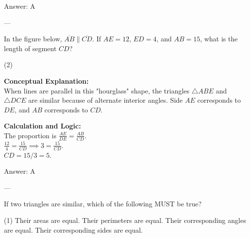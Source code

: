 \documentclass[11pt,paper=a4,answers]{exam}
\begin{document}
\begin{questions}
\begin{solution}
\vspace{15pt}
Answer: \colorbox{yellow!100}{A}
\end{solution}

---

\question
In the figure below, $\overline{AB} \parallel \overline{CD}$. If $AE = 12$, $ED = 4$, and $AB = 15$, what is the length of segment $CD$?
\begin{center}
\end{center}
\begin{tasks}(2)
\end{tasks}

\begin{solution}
\textbf{Conceptual Explanation:} \\
When lines are parallel in this "hourglass" shape, the triangles $\triangle ABE$ and $\triangle DCE$ are similar because of alternate interior angles. Side $AE$ corresponds to $DE$, and $AB$ corresponds to $CD$.

\vspace{10pt}
\textbf{Calculation and Logic:} \\
The proportion is $\frac{AE}{DE} = \frac{AB}{CD}$. \\
$\frac{12}{4} = \frac{15}{CD} \implies 3 = \frac{15}{CD}$. \\
$CD = 15 / 3 = 5$.

\vspace{15pt}
Answer: \colorbox{yellow!100}{A}
\end{solution}

% 

---

\question
If two triangles are similar, which of the following MUST be true?
\begin{tasks}(1)
    \task Their areas are equal.
    \task Their perimeters are equal.
    \task Their corresponding angles are equal.
    \task Their corresponding sides are equal.
\end{tasks}


\end{questions}
\end{document}
